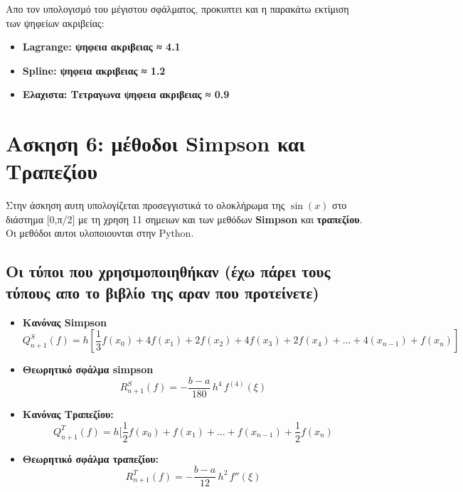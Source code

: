 \documentclass[18pt]{article}
\begin{document}
\vspace{0.5cm}
Απο τον υπολογισμό του μέγιστου σφάλματος, προκυπτει και η παρακάτω εκτίμιση των ψηφείων ακριβείας:
\vspace{0.2cm}

\begin{itemize}
    \item \textbf{Lagrange: ψηφεια ακριβειας ≈ 4.1}
    \item \textbf{Spline: ψηφεια ακριβειας ≈ 1.2}
    \item \textbf{Ελαχιστα: Τετραγωνα ψηφεια ακριβειας ≈ 0.9}
\end{itemize}
\newpage

\section*{Ασκηση 6: μέθοδοι Simpson και Τραπεζίου}

Στην άσκηση αυτη υπολογίζεται προσεγγιστικά το ολοκλήρωμα της $\sin(x)$ στο διάστημα [0,π/2] με τη χρηση 11 σημειων και των μεθόδων \textbf{Simpson} και \textbf{τραπεζίου}. Οι μεθόδοι αυτοι υλοποιουνται στην Python.

\vspace{0.1cm}

\subsection*{Οι τύποι που χρησιμοποιηθήκαν (έχω πάρει τους τύπους απο το βιβλίο της αραν που προτείνετε)}

\vspace{0.5cm}

\begin{itemize}

\item \textbf{Κανόνας Simpson}
\[
Q_{n+1}^{S}(f) = h[\frac{1}{3}f(x_0) + 4f(x_1) + 2f(x_2) + 4f(x_3) + 2f(x_4) + ... + 4(x_{n-1}) + f(x_n)]
\]

\item \textbf{Θεωρητικό σφάλμα simpson}
\[
R_{n+1}^{S}(f) = -\frac{b-a}{180}\,h^4\,f^{(4)}(\xi)
\]

\item \textbf{Κανόνας Τραπεζίου:}
\[
Q_{n+1}^{T}(f) = h[\frac{1}{2}f(x_0) + f(x_1) + ... + f(x_{n-1}) + \frac{1}{2}f(x_n)
\]

\item \textbf{Θεωρητικό σφάλμα τραπεζίου:}
\[
R_{n+1}^{T}(f) = -\frac{b-a}{12}\, h^2\, f''(\xi)
\]

\end{itemize}
\end{document}
